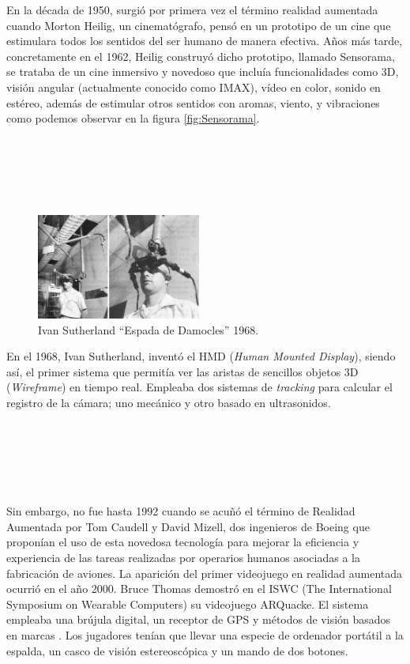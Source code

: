 En la década de 1950, surgió por primera vez el término realidad aumentada cuando Morton Heilig, un cinematógrafo, pensó en un prototipo de un cine que estimulara todos los sentidos del ser humano de manera efectiva. Años más tarde, concretamente en el 1962, Heilig construyó dicho prototipo, llamado Sensorama, se trataba de un cine inmersivo y novedoso que incluía funcionalidades como 3D, visión angular (actualmente conocido como IMAX), vídeo en color, sonido en estéreo, además de estimular otros sentidos con aromas, viento, y vibraciones como podemos observar en la figura \ref{fig:Sensorama}.\\
\\
\\
\\
\\
\\

\begin{figure}
    \centering
    \includegraphics[width=0.48\textwidth]{Images/HumanMountDisplay.png}
    \caption{Ivan Sutherland “Espada de Damocles” 1968.}
    \label{fig:EspadaDamocles}
\end{figure}

En el 1968, Ivan Sutherland, inventó el HMD (\textit{Human Mounted Display}), siendo así, el primer sistema que permitía ver las aristas de sencillos objetos 3D (\textit{Wireframe}) en tiempo real. Empleaba dos sistemas de \textit{tracking} para calcular el registro de la cámara; uno mecánico y otro basado en ultrasonidos.\\
\\
\\
\\
\\
\\
\\


Sin embargo, no fue hasta 1992 cuando se acuñó el término de Realidad Aumentada por Tom Caudell y David Mizell, dos ingenieros de Boeing que proponían el uso de esta novedosa tecnología para mejorar la eficiencia y experiencia de las tareas realizadas por operarios humanos asociadas a la fabricación de aviones.
La aparición del primer videojuego en realidad aumentada ocurrió en el año 2000. Bruce Thomas demostró en el ISWC (The International Symposium on Wearable Computers) su videojuego ARQuacke. El sistema empleaba una brújula digital, un receptor de GPS y métodos de visión basados en marcas \cite{ARToolkit}. Los jugadores tenían que llevar una especie de ordenador portátil a la espalda, un casco de visión estereoscópica y un mando de dos botones.\cite{ARQuake}

